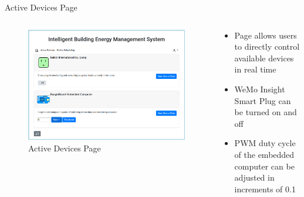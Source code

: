 \documentclass{beamer}
\begin{document}
\begin{frame}{Active Devices Page}{} %
    \begin{columns}
      \begin{figure}
            \centering
            \includegraphics[scale=0.13]{figs/webServer/ActiveDevices_screen.png}
            \caption{Active Devices Page}
            \label{fig:active_devices}
        \end{figure}
        \begin{block}{}
          \begin{itemize}
            \item Page allows users to directly control available devices in real time
            \item WeMo Insight Smart Plug can be turned on and off
            \item PWM duty cycle of the embedded computer can be adjusted in increments of 0.1
        \end{itemize}
        \end{block}
    \end{columns}
\end{frame}
\end{document}
